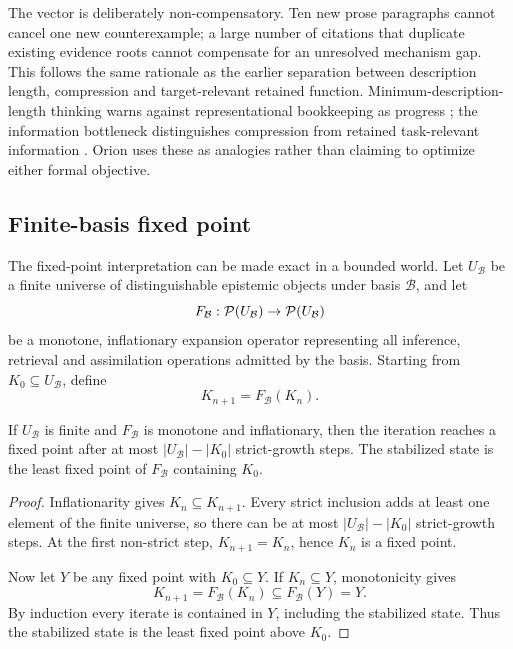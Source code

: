The vector is deliberately non-compensatory. Ten new prose paragraphs cannot cancel one new counterexample; a large number of citations that duplicate existing evidence roots cannot compensate for an unresolved mechanism gap. This follows the same rationale as the earlier separation between description length, compression and target-relevant retained function. Minimum-description-length thinking warns against representational bookkeeping as progress \cite{rissanen1978}; the information bottleneck distinguishes compression from retained task-relevant information \cite{tishby2000}. Orion uses these as analogies rather than claiming to optimize either formal objective.

\subsection{Finite-basis fixed point}

The fixed-point interpretation can be made exact in a bounded world. Let \(U_{\mathcal B}\) be a finite universe of distinguishable epistemic objects under basis \(\mathcal B\), and let
\[
F_{\mathcal B}:\mathcal P(U_{\mathcal B})\to\mathcal P(U_{\mathcal B})
\]
be a monotone, inflationary expansion operator representing all inference, retrieval and assimilation operations admitted by the basis. Starting from \(K_0\subseteq U_{\mathcal B}\), define
\[
K_{n+1}=F_{\mathcal B}(K_n).
\]

\begin{theorem}\label{thm:finite-basis}
If \(U_{\mathcal B}\) is finite and \(F_{\mathcal B}\) is monotone and inflationary, then the iteration reaches a fixed point after at most \(|U_{\mathcal B}|-|K_0|\) strict-growth steps. The stabilized state is the least fixed point of \(F_{\mathcal B}\) containing \(K_0\).
\end{theorem}

\begin{proof}
Inflationarity gives \(K_n\subseteq K_{n+1}\). Every strict inclusion adds at least one element of the finite universe, so there can be at most \(|U_{\mathcal B}|-|K_0|\) strict-growth steps. At the first non-strict step, \(K_{n+1}=K_n\), hence \(K_n\) is a fixed point.

Now let \(Y\) be any fixed point with \(K_0\subseteq Y\). If \(K_n\subseteq Y\), monotonicity gives
\[
K_{n+1}=F_{\mathcal B}(K_n)\subseteq F_{\mathcal B}(Y)=Y.
\]
By induction every iterate is contained in \(Y\), including the stabilized state. Thus the stabilized state is the least fixed point above \(K_0\).
\end{proof}

